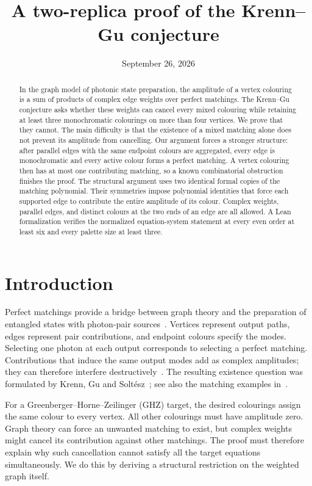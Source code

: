 \documentclass[11pt]{article}
\title{A two-replica proof of the Krenn--Gu conjecture}
\author{}
\date{September 26, 2026}
\theoremstyle{definition}
\theoremstyle{plain}
\numberwithin{equation}{section}
\begin{document}
\maketitle
\begin{abstract}
In the graph model of photonic state preparation, the amplitude of a vertex
colouring is a sum of products of complex edge weights over perfect matchings.
The Krenn--Gu conjecture asks whether these weights can cancel every mixed
colouring while retaining at least three monochromatic colourings on more
than four vertices. We prove that they cannot. The main difficulty is that
the existence of a mixed matching alone does not prevent its amplitude from
cancelling. Our argument forces a stronger structure: after parallel edges
with the same endpoint colours are aggregated, every edge is monochromatic
and every active colour forms a perfect matching. A vertex colouring then
has at most one contributing matching, so a known combinatorial obstruction
finishes the proof. The structural argument uses two identical formal copies
of the matching polynomial. Their symmetries impose polynomial identities
that force each supported edge to contribute the entire amplitude of its
colour. Complex weights, parallel edges, and distinct colours at the two
ends of an edge are all allowed. A Lean formalization verifies the normalized
equation-system statement at every even order at least six and every palette
size at least three.
\end{abstract}

\section{Introduction}\label{sec:introduction}

Perfect matchings provide a bridge between graph theory and the preparation
of entangled states with photon-pair sources~\cite{kgz}. Vertices represent output paths,
edges represent pair contributions, and endpoint colours specify the modes.
Selecting one photon at each output corresponds to selecting a perfect
matching. Contributions that induce the same output modes add as complex
amplitudes; they can therefore interfere destructively~\cite{graphs2}. The resulting
existence question was formulated by Krenn, Gu and
Solt\'esz~\cite[Question~1]{kgs}; see also the matching examples
in~\cite[Section~2]{logic}.

For a Greenberger--Horne--Zeilinger (GHZ) target, the desired colourings assign the same colour to every
vertex. All other colourings must have amplitude zero. Graph theory can
force an unwanted matching to exist, but complex weights might cancel its
contribution against other matchings. The proof must therefore explain why
such cancellation cannot satisfy all the target equations simultaneously.
We do this by deriving a structural restriction on the weighted graph itself.
\end{document}
